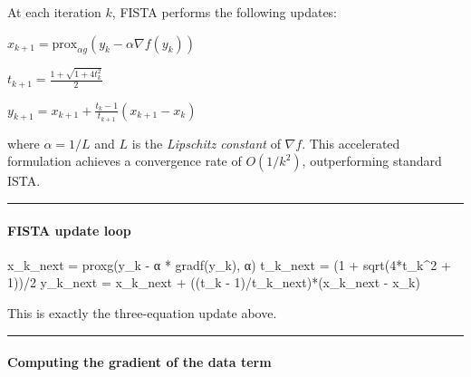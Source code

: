 \documentclass[11pt]{article}
\newenvironment{Shaded}{}{}
\newcommand{\DecValTok}[1]{\textcolor[rgb]{0.25,0.63,0.44}{{#1}}}
\newcommand{\NormalTok}[1]{{#1}}
\newcommand{\OperatorTok}[1]{\textcolor[rgb]{0.40,0.40,0.40}{{#1}}}
\begin{document}
At each iteration \(k\), FISTA performs the following updates:

\(x_{k+1} = \text{prox}_{\alpha g}(y_k - \alpha \nabla f(y_k))\)

\(t_{k+1} = \frac{1 + \sqrt{1 + 4t_k^2}}{2}\)

\(y_{k+1} = x_{k+1} + \frac{t_k - 1}{t_{k+1}}(x_{k+1} - x_k)\)

where \(\alpha = 1/L\) and \(L\) is the \emph{Lipschitz constant} of
\(\nabla f\). This accelerated formulation achieves a convergence rate
of \(O(1/k^2)\), outperforming standard ISTA.

\begin{center}\rule{0.5\linewidth}{0.5pt}\end{center}

\hypertarget{fista-update-loop}{%
\paragraph{\texorpdfstring{\textbf{FISTA update
loop}}{FISTA update loop}}\label{fista-update-loop}}

\begin{Shaded}
\begin{Highlighting}[]
\NormalTok{x\_k\_next }\OperatorTok{=}\NormalTok{ proxg(y\_k }\OperatorTok{{-}}\NormalTok{ α }\OperatorTok{*}\NormalTok{ gradf(y\_k), α)}
\NormalTok{t\_k\_next }\OperatorTok{=}\NormalTok{ (}\DecValTok{1} \OperatorTok{+}\NormalTok{ sqrt(}\DecValTok{4}\OperatorTok{*}\NormalTok{t\_k}\OperatorTok{\^{}}\DecValTok{2} \OperatorTok{+} \DecValTok{1}\NormalTok{))}\OperatorTok{/}\DecValTok{2}
\NormalTok{y\_k\_next }\OperatorTok{=}\NormalTok{ x\_k\_next }\OperatorTok{+}\NormalTok{ ((t\_k }\OperatorTok{{-}} \DecValTok{1}\NormalTok{)}\OperatorTok{/}\NormalTok{t\_k\_next)}\OperatorTok{*}\NormalTok{(x\_k\_next }\OperatorTok{{-}}\NormalTok{ x\_k)}
\end{Highlighting}
\end{Shaded}

This is exactly the three-equation update above.

\begin{center}\rule{0.5\linewidth}{0.5pt}\end{center}

\hypertarget{computing-the-gradient-of-the-data-term}{%
\paragraph{\texorpdfstring{\textbf{Computing the gradient of the data
term}}{Computing the gradient of the data term}}\label{computing-the-gradient-of-the-data-term}}
\end{document}
